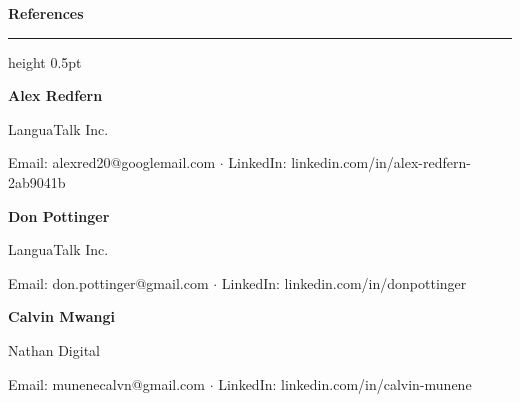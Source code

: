 \documentclass[10pt,a4paper]{article}
\newcommand{\cvsection}[1]{%
    \par\vspace{8pt}%
    {\color{headingcolor}\Large\bfseries #1}\par
    \vspace{2pt}%
    {\color{rulecolor}\hrule height 0.5pt}%
    \vspace{4pt}%
}
\newcommand{\entry}[4]{%
    \par\vspace{4pt}
    {\textbf{#1} \hfill #2}\par
    {\small #3 \hfill #4}\par
    \vspace{2pt}
}
\begin{document}
\cvsection{References}

\entry{Alex Redfern}{}{LanguaTalk Inc.}{}
Email: alexred20@googlemail.com $\cdot$ LinkedIn: linkedin.com/in/alex-redfern-2ab9041b

\vspace{4pt}

\entry{Don Pottinger}{}{LanguaTalk Inc.}{}
Email: don.pottinger@gmail.com $\cdot$ LinkedIn: linkedin.com/in/donpottinger

\vspace{4pt}

\entry{Calvin Mwangi}{}{Nathan Digital}{}
Email: munenecalvn@gmail.com $\cdot$ LinkedIn: linkedin.com/in/calvin-munene
\end{document}
